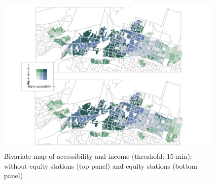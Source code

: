 \documentclass[]{elsarticle} %
\begin{document}
\begin{figure}
\includegraphics[width=1\linewidth]{Bike-share-spatial-equity_files/figure-latex/figure-bi-map-threshold-15-1} \caption{\label{fig-bivariate-map-threshold-15}Bivariate map of accessibility and income (threshold: 15 min): without equity stations (top panel) and equity stations (bottom panel)}\label{fig:figure-bi-map-threshold-15}
\end{figure}
\end{document}
